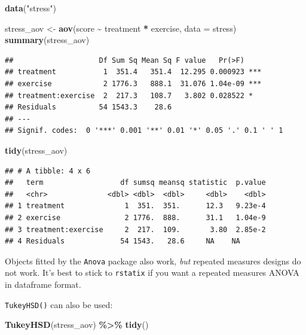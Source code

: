 \documentclass[
]{book}
\newenvironment{Shaded}{\begin{snugshade}}{\end{snugshade}}
\newcommand{\AttributeTok}[1]{\textcolor[rgb]{0.13,0.29,0.53}{#1}}
\newcommand{\FunctionTok}[1]{\textcolor[rgb]{0.13,0.29,0.53}{\textbf{#1}}}
\newcommand{\NormalTok}[1]{#1}
\newcommand{\OtherTok}[1]{\textcolor[rgb]{0.56,0.35,0.01}{#1}}
\newcommand{\SpecialCharTok}[1]{\textcolor[rgb]{0.81,0.36,0.00}{\textbf{#1}}}
\newcommand{\StringTok}[1]{\textcolor[rgb]{0.31,0.60,0.02}{#1}}
\begin{document}
\begin{Shaded}
\begin{Highlighting}[]
\FunctionTok{data}\NormalTok{(}\StringTok{"stress"}\NormalTok{)}

\NormalTok{stress\_aov }\OtherTok{\textless{}{-}} \FunctionTok{aov}\NormalTok{(score }\SpecialCharTok{\textasciitilde{}}\NormalTok{ treatment }\SpecialCharTok{*}\NormalTok{ exercise, }\AttributeTok{data =}\NormalTok{ stress)}
\FunctionTok{summary}\NormalTok{(stress\_aov)}
\end{Highlighting}
\end{Shaded}

\begin{verbatim}
##                    Df Sum Sq Mean Sq F value   Pr(>F)    
## treatment           1  351.4   351.4  12.295 0.000923 ***
## exercise            2 1776.3   888.1  31.076 1.04e-09 ***
## treatment:exercise  2  217.3   108.7   3.802 0.028522 *  
## Residuals          54 1543.3    28.6                     
## ---
## Signif. codes:  0 '***' 0.001 '**' 0.01 '*' 0.05 '.' 0.1 ' ' 1
\end{verbatim}

\begin{Shaded}
\begin{Highlighting}[]
\FunctionTok{tidy}\NormalTok{(stress\_aov)}
\end{Highlighting}
\end{Shaded}

\begin{verbatim}
## # A tibble: 4 x 6
##   term                  df sumsq meansq statistic  p.value
##   <chr>              <dbl> <dbl>  <dbl>     <dbl>    <dbl>
## 1 treatment              1  351.  351.      12.3   9.23e-4
## 2 exercise               2 1776.  888.      31.1   1.04e-9
## 3 treatment:exercise     2  217.  109.       3.80  2.85e-2
## 4 Residuals             54 1543.   28.6     NA    NA
\end{verbatim}

Objects fitted by the \texttt{Anova} package also work, \emph{but} repeated measures designs do not work. It's best to stick to \texttt{rstatix} if you want a repeated measures ANOVA in dataframe format.

\texttt{TukeyHSD()} can also be used:

\begin{Shaded}
\begin{Highlighting}[]
\FunctionTok{TukeyHSD}\NormalTok{(stress\_aov) }\SpecialCharTok{\%\textgreater{}\%}
  \FunctionTok{tidy}\NormalTok{()}
\end{Highlighting}
\end{Shaded}
\end{document}
